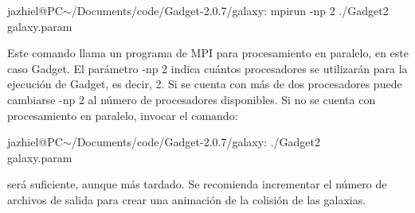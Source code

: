 \documentclass[a4paper,openright,12pt]{book}
\begin{document}
\begin{enumerate}
\textsf{jazhiel@PC$\sim$/Documents/code/Gadget-2.0.7/galaxy: mpirun -np 2 ./Gadget2 galaxy.param}

Este comando llama un programa de MPI para procesamiento en paralelo, en este caso Gadget. El parámetro \textsf{-np 2} indica cuántos procesadores se utilizarán para la ejecución de Gadget, es decir, 2. Si se cuenta con más de dos procesadores puede cambiarse \textsf{-np 2} al número de procesadores disponibles. Si no se cuenta con procesamiento en paralelo, invocar el comando:

\textsf{jazhiel@PC$\sim$/Documents/code/Gadget-2.0.7/galaxy: ./Gadget2\\ galaxy.param}

será suficiente, aunque más tardado. Se recomienda incrementar el número de archivos de salida para crear una animación de la colisión de las galaxias.
\end{enumerate}
\end{document}
